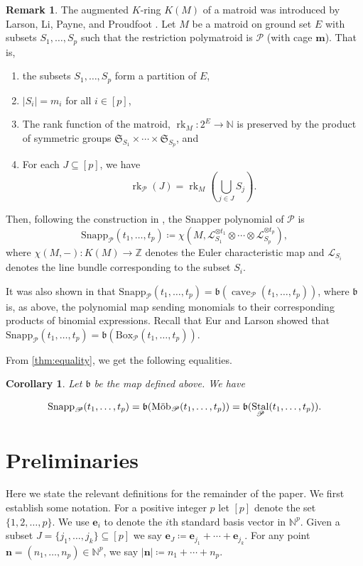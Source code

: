 \documentclass[a4paper, 11pt]{amsart}
\newtheorem{corollary}[corollary]{Corollary}
\theoremstyle{definition}
\newtheorem{remark}[remark]{Remark}
\newcommand{\bfm}{\mathbf{m}}
\newcommand{\bfn}{\mathbf{n}}
\newcommand{\bfe}{\mathbf{e}}
\newcommand{\sP}{\mathscr{P}}
\newcommand{\N}{\mathbb{N}}
\newcommand{\Z}{\mathbb{Z}}
\DeclareMathOperator{\rk}{rk}
\DeclareMathOperator{\cave}{cave}
\DeclareMathOperator{\Stal}{Stal}
\begin{document}
\begin{remark}\label{rk:Snapp}
The augmented $K$-ring $K(M)$ of a matroid was introduced by Larson, Li, Payne, and Proudfoot \cite{LLPP}. Let $M$ be a matroid on ground set $E$ with subsets $S_1, \ldots, S_p$ such that the restriction polymatroid is $\sP$ (with cage $\bfm$). That is, 
\begin{enumerate}
\item the subsets $S_1, \ldots, S_p$ form a partition of $E$,
\item $|S_i| = m_i$ for all $i \in [p]$,
\item The rank function of the matroid, $\rk_M:2^E \to \N$ is preserved by the product of symmetric groups $\mathfrak{S}_{S_1}\times \cdots \times \mathfrak{S}_{S_p}$, and 
\item For each $J \subseteq [p]$, we have $$\rk_\sP(J) = \rk_M\left(\bigcup_{j \in J}S_j\right).$$
\end{enumerate}

Then, following the construction in \cite{LLPP}, the Snapper polynomial of $\sP$ is 
\[\mathrm{Snapp}_\sP(t_1,\ldots,t_p) \coloneqq \chi\left(M, \mathcal{L}_{S_1}^{\otimes t_1} \otimes \cdots \otimes \mathcal{L}_{S_p}^{\otimes t_p}\right),\]
where $\chi(M,-)\colon K(M) \to \Z$ denotes the Euler characteristic map and $\mathcal{L}_{S_i}$ denotes the line bundle corresponding to the subset $S_i$. 

 It was also shown in \cite{CRMS} that $\mathrm{Snapp}_{\sP}(t_1,\ldots,t_p) = \mathfrak{b}(\cave_\sP(t_1,\ldots,t_p))$, where $\mathfrak{b}$ is, as above, the polynomial map sending monomials to their corresponding products of binomial expressions. Recall that Eur and Larson showed that $\mathrm{Snapp}_\sP(t_1,\ldots,t_p) = \mathfrak{b}(\mathrm{Box}_\sP(t_1,\ldots,t_p))$\cite[Proposition 2.8]{EL23}.
 \end{remark}
 
 From \autoref{thm:equality}, we get the following equalities. 

\begin{corollary} Let $\mathfrak{b}$ be the map defined above. We have

\[\mathrm{Snapp}_{\sP}(t_1,\ldots,t_p) 
    = \mathfrak{b}(\textnormal{M\"ob}_\sP(t_1,\ldots,t_p)) 
    = \mathfrak{b}(\Stal_\sP(t_1,\ldots,t_p)).\]
\end{corollary}



\section{Preliminaries}\label{sec:caves}
Here we state the relevant definitions for the remainder of the paper. We first establish some notation. For a positive integer $p$ let $[p]$ denote the set $\{1, 2, \ldots, p\}$. We use $\bfe_i$ to denote the $i$th standard basis vector in $\N^p$. Given a subset $J = \{j_1,\ldots,j_k\} \subseteq [p]$ we say $\bfe_J \coloneqq \bfe_{j_1}+\cdots+\bfe_{j_k}$. For any point $\bfn = (n_1,\ldots,n_p) \in \N^p$, we say $|\bfn| \coloneq n_1+\cdots + n_p$.
\end{document}
